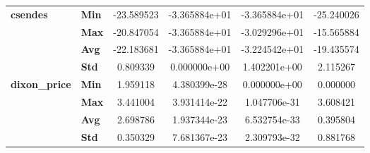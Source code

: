 \begin{longtable}{llcccc}
\cline{1-6}
\multirow{4}{*}{\textbf{csendes}} & \textbf{Min} &   -23.589523 & -3.365884e+01 & -3.365884e+01 &   -25.240026 \\
            & \textbf{Max} &   -20.847054 & -3.365884e+01 & -3.029296e+01 &   -15.565884 \\
            & \textbf{Avg} &   -22.183681 & -3.365884e+01 & -3.224542e+01 &   -19.435574 \\
            & \textbf{Std} &     0.809339 &  0.000000e+00 &  1.402201e+00 &     2.115267 \\
\cline{1-6}
\multirow{4}{*}{\textbf{dixon_price}} & \textbf{Min} &     1.959118 &  4.380399e-28 &  0.000000e+00 &     0.000000 \\
            & \textbf{Max} &     3.441004 &  3.931414e-22 &  1.047706e-31 &     3.608421 \\
            & \textbf{Avg} &     2.698786 &  1.937344e-23 &  6.532754e-33 &     0.395804 \\
            & \textbf{Std} &     0.350329 &  7.681367e-23 &  2.309793e-32 &     0.881768 \\
\end{longtable}
